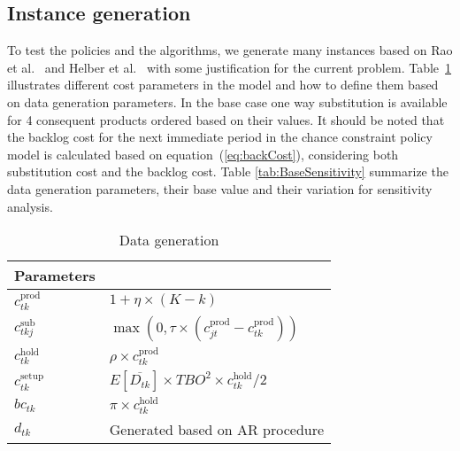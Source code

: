 \documentclass[10pt]{article}
\newcommand{\ti}{t} %
\newcommand{\ka}{k} %
\newcommand{\Ka}{K}
\newcommand{\jey}{j} %
\begin{document}
\subsection{Instance generation}

To test the policies and the algorithms, we generate many instances based on Rao et al.~\cite{rao2004multi} and Helber et al.~\cite{helber2013dynamic} with some justification for the current problem. Table~\ref{tab:Sub_FD_parameters} illustrates different cost parameters in the model and how to define them based on data generation parameters. In the base case one way substitution is available for 4 consequent products ordered based on their values. It should be noted that the backlog cost for the next immediate period in the chance constraint policy model is calculated based on equation~(\ref{eq:backCost}), considering both substitution cost and the backlog cost. Table \ref{tab:BaseSensitivity} summarize the data generation parameters, their base value and their variation for sensitivity analysis. 




\begin{table}[h]
\centering
\caption{Data generation }
\begin{tabular}{ll}
\toprule
{\bf Parameters} &  \\ \midrule
$c^{\text{prod}}_{\ti \ka}$  & $1+\eta \times(\Ka-\ka)$ 
\\
$c^{\text{sub}}_{\ti \ka \jey }$  & $\max(0,\tau \times (c^{\text{prod}}_{\jey \ti} - c^{\text{prod}}_{\ti \ka}))$ 
\\ 
$c^{\text{hold}}_{\ti \ka}$  & $\rho \times c^{\text{prod}}_{\ti \ka} $ 
\\ 
$c^{\text{setup}}_{\ti \ka}$ & $E[\overline{D_{\ti \ka}}] \times TBO^2 \times c^{\text{hold}}_{\ti \ka} /2$ \\ 
$bc_{\ti \ka}$  &  $\pi \times c^{\text{hold}}_{\ti \ka}$ \\
${d}_{\ti \ka}$  & Generated based on AR procedure
 \\ \bottomrule
\end{tabular}
 \label{tab:Sub_FD_parameters}
\end{table}
\end{document}
